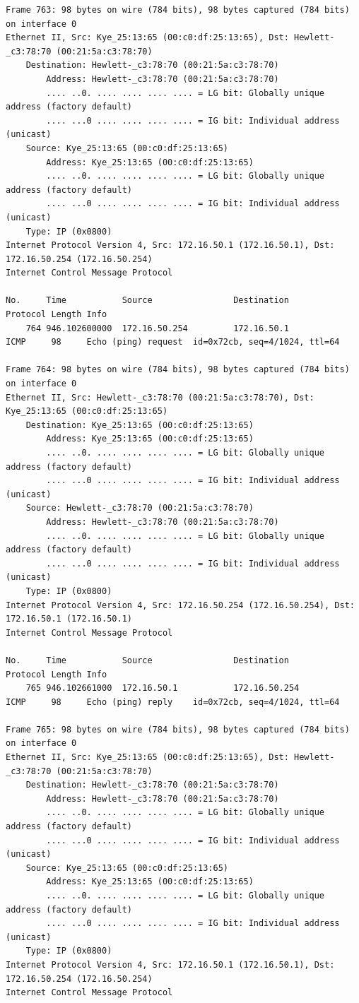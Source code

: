 \documentclass[a4paper,11pt]{article}
\begin{document}
\begin{lstlisting}
Frame 763: 98 bytes on wire (784 bits), 98 bytes captured (784 bits) on interface 0
Ethernet II, Src: Kye_25:13:65 (00:c0:df:25:13:65), Dst: Hewlett-_c3:78:70 (00:21:5a:c3:78:70)
    Destination: Hewlett-_c3:78:70 (00:21:5a:c3:78:70)
        Address: Hewlett-_c3:78:70 (00:21:5a:c3:78:70)
        .... ..0. .... .... .... .... = LG bit: Globally unique address (factory default)
        .... ...0 .... .... .... .... = IG bit: Individual address (unicast)
    Source: Kye_25:13:65 (00:c0:df:25:13:65)
        Address: Kye_25:13:65 (00:c0:df:25:13:65)
        .... ..0. .... .... .... .... = LG bit: Globally unique address (factory default)
        .... ...0 .... .... .... .... = IG bit: Individual address (unicast)
    Type: IP (0x0800)
Internet Protocol Version 4, Src: 172.16.50.1 (172.16.50.1), Dst: 172.16.50.254 (172.16.50.254)
Internet Control Message Protocol

No.     Time           Source                Destination           Protocol Length Info
    764 946.102600000  172.16.50.254         172.16.50.1           ICMP     98     Echo (ping) request  id=0x72cb, seq=4/1024, ttl=64

Frame 764: 98 bytes on wire (784 bits), 98 bytes captured (784 bits) on interface 0
Ethernet II, Src: Hewlett-_c3:78:70 (00:21:5a:c3:78:70), Dst: Kye_25:13:65 (00:c0:df:25:13:65)
    Destination: Kye_25:13:65 (00:c0:df:25:13:65)
        Address: Kye_25:13:65 (00:c0:df:25:13:65)
        .... ..0. .... .... .... .... = LG bit: Globally unique address (factory default)
        .... ...0 .... .... .... .... = IG bit: Individual address (unicast)
    Source: Hewlett-_c3:78:70 (00:21:5a:c3:78:70)
        Address: Hewlett-_c3:78:70 (00:21:5a:c3:78:70)
        .... ..0. .... .... .... .... = LG bit: Globally unique address (factory default)
        .... ...0 .... .... .... .... = IG bit: Individual address (unicast)
    Type: IP (0x0800)
Internet Protocol Version 4, Src: 172.16.50.254 (172.16.50.254), Dst: 172.16.50.1 (172.16.50.1)
Internet Control Message Protocol

No.     Time           Source                Destination           Protocol Length Info
    765 946.102661000  172.16.50.1           172.16.50.254         ICMP     98     Echo (ping) reply    id=0x72cb, seq=4/1024, ttl=64

Frame 765: 98 bytes on wire (784 bits), 98 bytes captured (784 bits) on interface 0
Ethernet II, Src: Kye_25:13:65 (00:c0:df:25:13:65), Dst: Hewlett-_c3:78:70 (00:21:5a:c3:78:70)
    Destination: Hewlett-_c3:78:70 (00:21:5a:c3:78:70)
        Address: Hewlett-_c3:78:70 (00:21:5a:c3:78:70)
        .... ..0. .... .... .... .... = LG bit: Globally unique address (factory default)
        .... ...0 .... .... .... .... = IG bit: Individual address (unicast)
    Source: Kye_25:13:65 (00:c0:df:25:13:65)
        Address: Kye_25:13:65 (00:c0:df:25:13:65)
        .... ..0. .... .... .... .... = LG bit: Globally unique address (factory default)
        .... ...0 .... .... .... .... = IG bit: Individual address (unicast)
    Type: IP (0x0800)
Internet Protocol Version 4, Src: 172.16.50.1 (172.16.50.1), Dst: 172.16.50.254 (172.16.50.254)
Internet Control Message Protocol


\end{lstlisting}
\end{document}
